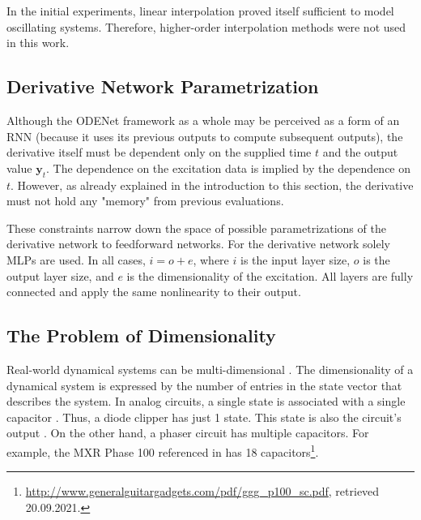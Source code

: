In the initial experiments, linear interpolation proved itself sufficient to model oscillating systems. Therefore, higher-order interpolation methods were not used in this work.

\subsection{Derivative Network Parametrization}
\label{subsec:derivative_parametrization}

Although the ODENet framework as a whole may be perceived as a form of an \ac{RNN} (because it uses its previous outputs to compute subsequent outputs), the derivative itself must be dependent only on the supplied time $t$ and the output value $\pmb{y}_t$. The dependence on the excitation data is implied by the dependence on $t$. However, as already explained in the introduction to this section, the derivative must not hold any "memory" from previous evaluations.

These constraints narrow down the space of possible parametrizations of the derivative network to feedforward networks. For the derivative network solely \acp{MLP} are used. In all cases, $i = o + e$, where $i$ is the input layer size, $o$ is the output layer size, and $e$ is the dimensionality of the excitation. All layers are fully connected and apply the same nonlinearity to their output.

\subsection{The Problem of Dimensionality}
\label{subsec:dimensionality}
Real-world dynamical systems can be multi-dimensional \cite{Scheinerman1996}. The dimensionality of a dynamical system is expressed by the number of entries in the state vector that describes the system. In analog circuits, a single state is associated with a single capacitor \cite{Parker2019}. Thus, a diode clipper has just 1 state. This state is also the circuit's output \cite{Parker2019}. On the other hand, a phaser circuit has multiple capacitors. For example, the MXR Phase 100 referenced in \cite{Kiiski2016} has 18 capacitors\footnote{\url{http://www.generalguitargadgets.com/pdf/ggg_p100_sc.pdf}, retrieved 20.09.2021.}.

